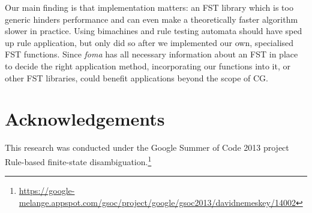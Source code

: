 \documentclass[11pt]{article}
\begin{document}
Our main finding is that implementation matters: an FST library which is too generic
hinders performance and can even make a theoretically faster algorithm slower
in practice. Using bimachines and rule testing automata should have sped up
rule application, but only did so after we implemented our own, specialised
FST functions. Since \emph{foma} has all necessary information about an FST in
place to decide the right application method, incorporating our functions into
it, or other FST libraries, could benefit applications beyond the scope of CG.


\section*{Acknowledgements}
This research was conducted under the Google Summer of Code 2013 project
Rule-based finite-state disambiguation.\footnote{
\url{https://google-melange.appspot.com/gsoc/project/google/gsoc2013/davidnemeskey/14002}}



\end{document}
